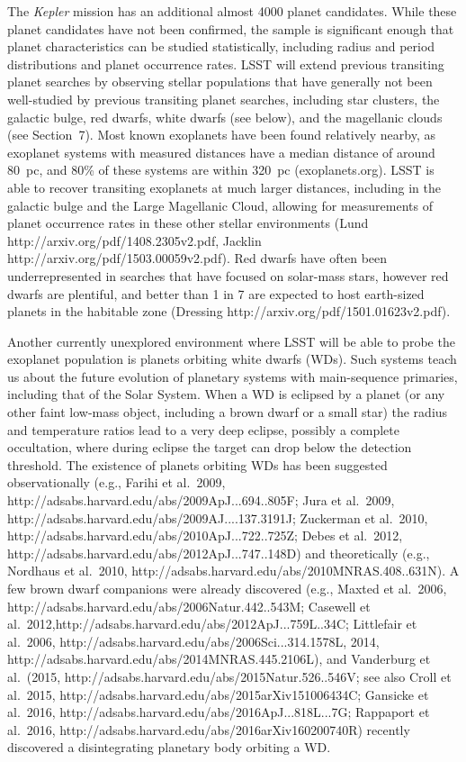 The {\it Kepler} mission has an additional almost 4000 planet
candidates. While these planet candidates have not been confirmed, the
sample is significant enough that planet characteristics can be studied
statistically, including radius and period distributions and planet
occurrence rates. LSST will extend previous transiting planet searches
by observing stellar populations that have generally not been
well-studied by previous transiting planet searches, including star
clusters, the galactic bulge, red dwarfs, white dwarfs (see below), and
the magellanic clouds (see Section~7). Most known exoplanets have been
found relatively nearby, as exoplanet systems with measured distances
have a median distance of around 80~pc, and 80\% of these systems are
within 320~pc (exoplanets.org). LSST is able to recover transiting
exoplanets at much larger distances, including in the galactic bulge and
the Large Magellanic Cloud, allowing for measurements of planet
occurrence rates in these other stellar environments (Lund
http://arxiv.org/pdf/1408.2305v2.pdf, Jacklin
http://arxiv.org/pdf/1503.00059v2.pdf). Red dwarfs have often been
underrepresented in searches that have focused on solar-mass stars,
however red dwarfs are plentiful, and better than 1 in 7 are expected to
host earth-sized planets in the habitable zone (Dressing
http://arxiv.org/pdf/1501.01623v2.pdf).

Another currently unexplored environment where LSST will be able to
probe the exoplanet population is planets orbiting white dwarfs (WDs).
Such systems teach us about the future evolution of planetary systems
with main-sequence primaries, including that of the Solar System. When a
WD is eclipsed by a planet (or any other faint low-mass object,
including a brown dwarf or a small star) the radius and temperature
ratios lead to a very deep eclipse, possibly a complete occultation,
where during eclipse the target can drop below the detection threshold.
The existence of planets orbiting WDs has been suggested observationally
(e.g., Farihi et al.~2009,
http://adsabs.harvard.edu/abs/2009ApJ...694..805F; Jura et al.~2009,
http://adsabs.harvard.edu/abs/2009AJ....137.3191J; Zuckerman et
al.~2010, http://adsabs.harvard.edu/abs/2010ApJ...722..725Z; Debes et
al.~2012, http://adsabs.harvard.edu/abs/2012ApJ...747..148D) and
theoretically (e.g., Nordhaus et al.~2010,
http://adsabs.harvard.edu/abs/2010MNRAS.408..631N). A few brown dwarf
companions were already discovered (e.g., Maxted et al.~2006,
http://adsabs.harvard.edu/abs/2006Natur.442..543M; Casewell et
al.~2012,http://adsabs.harvard.edu/abs/2012ApJ...759L..34C; Littlefair
et al.~2006, http://adsabs.harvard.edu/abs/2006Sci...314.1578L, 2014,
http://adsabs.harvard.edu/abs/2014MNRAS.445.2106L), and Vanderburg et
al.~(2015, http://adsabs.harvard.edu/abs/2015Natur.526..546V; see also
Croll et al.~2015, http://adsabs.harvard.edu/abs/2015arXiv151006434C;
Gansicke et al.~2016, http://adsabs.harvard.edu/abs/2016ApJ...818L...7G;
Rappaport et al.~2016,
http://adsabs.harvard.edu/abs/2016arXiv160200740R) recently discovered a
disintegrating planetary body orbiting a WD.

